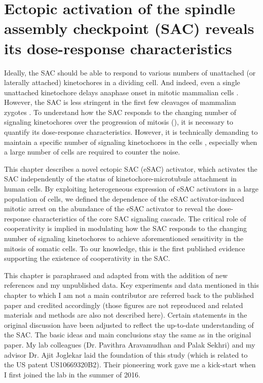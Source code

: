 \chapter{Ectopic activation of the spindle assembly checkpoint (SAC) reveals its dose-response characteristics}
\label{chpt:2}

Ideally, the SAC should be able to respond to various numbers of unattached (or laterally attached) kinetochores in a dividing cell. And indeed, even a single unattached kinetochore delays anaphase onset in mitotic mammalian cells \cite{PtK1SingleUnattachedKT}. However, the SAC is less stringent in the first few cleavages of mammalian zygotes \cite{MouseEmbryoSAC, ParentalGenomeUnification}. To understand how the SAC responds to the changing number of signaling kinetochores over the progression of mitosis (), it is necessary to quantify its dose-response characteristics. However, it is technically demanding to maintain a specific number of signaling kinetochores in the cells \cite{Ablation}, especially when a large number of cells are required to counter the noise.

This chapter describes a novel ectopic SAC (eSAC) activator, which activates the SAC independently of the status of kinetochore-microtubule attachment in human cells. By exploiting heterogeneous expression of eSAC activators in a large population of cells, we defined the dependence of the eSAC activator-induced mitotic arrest on the abundance of the eSAC activator to reveal the dose-response characteristics of the core SAC signaling cascade. The critical role of cooperativity is implied in modulating how the SAC responds to the changing number of signaling kinetochores to achieve aforementioned sensitivity in the mitosis of somatic cells. To our knowledge, this is the first published evidence supporting the existence of cooperativity in the SAC.

This chapter is paraphrased and adapted from \cite{eSAC} with the addition of new references and my unpublished data. Key experiments and data mentioned in this chapter to which I am not a main contributor are referred back to the published paper and credited accordingly (those figures are not reproduced and related materials and methods are also not described here). Certain statements in the original discussion have been adjusted to reflect the up-to-date understanding of the SAC. The basic ideas and main conclusions stay the same as in the original paper. My lab colleagues (Dr. Pavithra Aravamudhan and Palak Sekhri) and my advisor Dr. Ajit Joglekar laid the foundation of this study (which is related to the US patent US10669320B2). Their pioneering work gave me a kick-start when I first joined the lab in the summer of 2016. %

